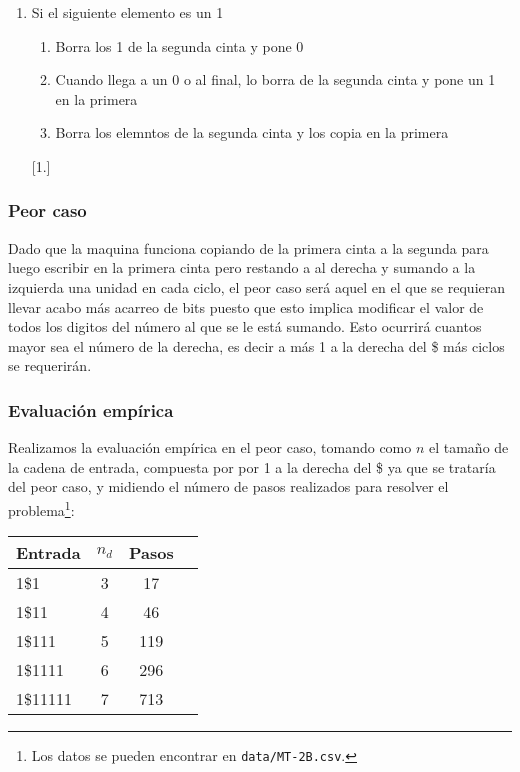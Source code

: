 \begin{itemize}
\begin{enumerate}[1.]
\begin{enumerate}[1.]
        \end{enumerate}[1.]
        \item Si el siguiente elemento es un 1
        \begin{enumerate}[1.]
            \item Borra los 1 de la segunda cinta y pone 0
            \item Cuando llega a un 0 o al final, lo borra de la segunda cinta y pone un 1 en la primera
            \item Borra los elemntos de la segunda cinta y los copia en la primera
        \end{enumerate}[1.]
    \end{enumerate}
\end{itemize}



\subsubsection*{Peor caso}
Dado que la maquina funciona copiando de la primera cinta a la segunda para luego escribir en la primera cinta pero restando a al derecha y sumando a la izquierda una unidad en cada ciclo, el peor caso será aquel en el que se requieran llevar acabo más acarreo de bits puesto que esto implica modificar el valor de todos los digitos del número al que se le está sumando. Esto ocurrirá cuantos mayor sea el número de la derecha, es decir a más 1 a la derecha del \$ más ciclos se requerirán.\\

\subsubsection*{Evaluación empírica}
Realizamos la evaluación empírica en el peor caso, tomando como $n$ el tamaño de la cadena de entrada, compuesta por por 1 a la derecha del \$ ya que se trataría del peor caso, y midiendo el número de pasos realizados para resolver el problema\footnote{Los datos se pueden encontrar en \texttt{data/MT-2B.csv}.}:

\begin{table}[h]
    \centering
    \begin{tabular}{lccc}
        Entrada & $n_d$ & Pasos \\
        \hline
        1\$1                     & 3  & 17   \\
        1\$11                    & 4  & 46   \\
        1\$111                   & 5  & 119   \\
        1\$1111                  & 6  & 296  \\
        1\$11111                 & 7  & 713  \\
    \end{tabular}
\end{table}

